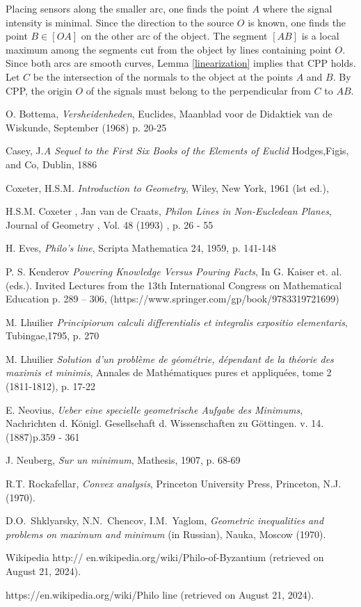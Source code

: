 \documentclass[a4paper,12pt]{amsart}
\begin{document}
Placing sensors along the smaller arc, one finds the point $A$
where the signal intensity is minimal. Since the direction to the
source $O$ is known, one finds the point $B \in [OA]$ on the other
arc of the object. The segment $[AB]$ is a local maximum among the
segments cut from the object by lines containing point $O$. Since
both arcs are smooth curves, Lemma \ref{linearization} implies
that CPP holds. Let $C$ be the intersection of the normals to the
object at the points $A$ and $B$. By CPP, the origin $O$ of the
signals must belong to the perpendicular from $C$ to $AB$.

\vspace{1cm}


\begin{thebibliography}{}

  O. Bottema, {\it Versheidenheden}, Euclides, Maanblad voor de Didaktiek van de Wiskunde, September (1968) p. 20-25

 Casey, J.{\it A Sequel to the First Six Books of the Elements of Euclid} Hodges,Figis, and Co, Dublin, 1886

Coxeter, H.S.M. {\it Introduction to Geometry}, Wiley, New York, 1961 (lst ed.),

H.S.M. Coxeter , Jan van de Craats, {\it Philon Lines in Non-Eucledean Planes}, Journal of Geometry , Vol. 48 (1993) , p. 26 - 55

 H. Eves, {\it Philo's line}, Scripta Mathematica 24, 1959, p. 141-148

 P. S. Kenderov {\it Powering Knowledge Versus Pouring Facts},
In G. Kaiser et. al. (eds.). Invited Lectures from the 13th International Congress on Mathematical Education p. 289 – 306, (https://www.springer.com/gp/book/9783319721699)



 M. Lhuilier {\it Principiorum calculi differentialis et integralis expositio elementaris}, Tubingae,1795, p. 270


M. Lhuilier {\it  Solution d’un problème de géométrie, dépendant
de la théorie des maximis et minimis},
Annales de Mathématiques pures et appliquées, tome 2 (1811-1812), p. 17-22

 E. Neovius, {\it  Ueber eine specielle geometrische Aufgabe des
Minimums}, Nachrichten d. Königl. Gesellsehaft d. Wissenschaften
zu Göttingen. v. 14. (1887)p.359 - 361

 J. Neuberg, {\it Sur un minimum}, Mathesis, 1907, p. 68-69


 R.T. Rockafellar, {\it Convex analysis},
Princeton University  Press, Princeton, N.J. (1970).

 D.O.~Shklyarsky, N.N.~Chencov, I.M.~Yaglom, {\it Geometric
inequalities and problems on maximum and minimum} (in Russian), Nauka, Moscow (1970).

 {Wikipedia http:// en.wikipedia.org/wiki/Philo-of-Byzantium}
 (retrieved on August 21, 2024).

  {https://en.wikipedia.org/wiki/Philo line} (retrieved on August 21, 2024).


\end{thebibliography}{}
\end{document}

